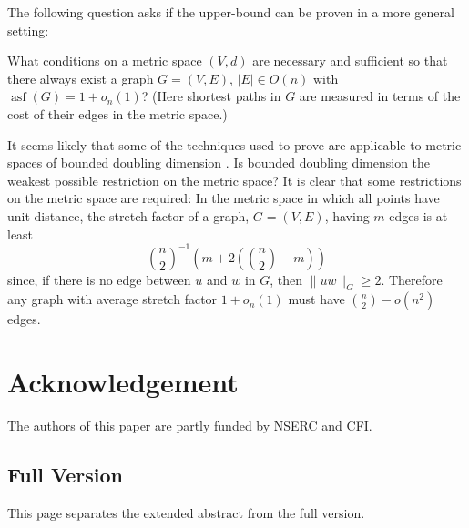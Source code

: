 \documentclass{patmorin}
\DeclareMathOperator{\asf}{asf}
\begin{document}
The following question asks if the upper-bound can be proven in a more
general setting:

\begin{op}
  What conditions on a metric space $(V,d)$ are necessary and sufficient
  so that there always exist a graph $G=(V,E)$, $|E|\in O(n)$ with
  $\asf(G)=1+o_n(1)$?  (Here shortest paths in $G$ are measured in terms
  of the cost of their edges in the metric space.)
\end{op}

It seems likely that some of the techniques used to prove
 are applicable to metric spaces of bounded doubling
dimension \cite[Section~10.13]{heinonen:lectures}.  Is bounded doubling
dimension the weakest possible restriction on the metric space?  It is
clear that some restrictions on the metric space are required: In the
metric space in which all points have unit distance, the stretch factor
of a graph, $G=(V,E)$, having $m$ edges is at least
\[
    \binom{n}{2}^{-1}\left(m + 2\left(\binom{n}{2}-m\right)\right) 
\]
since, if there is no edge between $u$ and $w$ in $G$, then $\|uw\|_G
\ge 2$.  Therefore any graph with average stretch factor $1+o_n(1)$
must have $\binom{n}{2}-o(n^2)$ edges.

\section*{Acknowledgement}

The authors of this paper are partly funded by NSERC and CFI.




\newpage

\begin{titlepage}
\appendix
\section{Full Version}
\hspace{.3\textheight}
\begin{center}
 \Huge
 This page separates the extended abstract from the full version.
\end{center}
\end{titlepage}
\end{document}
